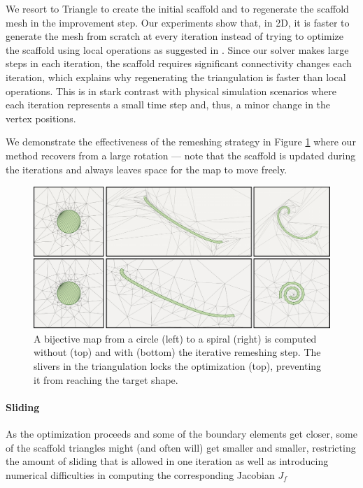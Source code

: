 We resort to Triangle \cite{Shewchuk:1996} to create the initial scaffold and to regenerate the scaffold mesh in the improvement step. Our experiments show that, in 2D, it is faster to generate the mesh from scratch at every iteration instead of trying to optimize the scaffold using local operations as suggested in \cite{Muller:2015}. Since our solver makes large steps in each iteration, the scaffold requires significant connectivity changes each iteration, which explains why regenerating the triangulation is faster than local operations. This is in stark contrast with physical simulation scenarios where each iteration represents a small time step and, thus, a minor change in the vertex positions.

We demonstrate the effectiveness of the remeshing strategy in Figure \ref{scaf:fig:recovering} where our method recovers from a large rotation --- note that the scaffold is updated during the iterations and always leaves space for the map to move freely.

\begin{figure}[h]
\includegraphics[width=\columnwidth]{figs/coil-remeshing}
\caption{
\label{scaf:fig:recovering}
A bijective map from a circle (left) to a spiral (right) is computed without (top) and with (bottom) the iterative remeshing step. The slivers in the triangulation locks the optimization (top), preventing it from reaching the target shape.
}
\end{figure}
\paragraph{Sliding }
As the optimization proceeds and some of the boundary elements get closer, some of the scaffold triangles might (and often will) get smaller and smaller, restricting the amount of sliding that is allowed in one iteration as well as introducing numerical difficulties in computing the corresponding Jacobian $J_f$ 

